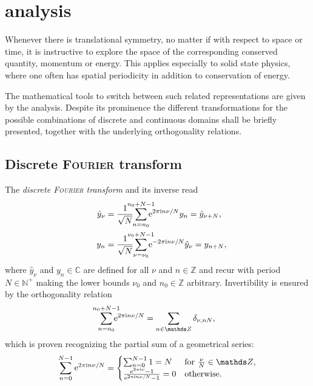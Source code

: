 
\chapter{ analysis}

Whenever there is translational symmetry, no matter if with respect to space or
time, it is instructive to explore the space of the corresponding conserved
quantity, momentum or energy. This applies especially to solid state physics,
where one often has spatial periodicity in addition to conservation of energy.

The mathematical tools to switch between such related representations are given
by the  analysis. Despite its prominence the different
transformations for the possible combinations of discrete and continuous domains
shall be briefly presented, together with the underlying orthogonality
relations.

\section{Discrete \textsc{Fourier} transform}

The \emph{discrete \textsc{Fourier} transform} and its inverse read
%
\begin{align*}
    \hat y_\nu &= \frac 1 {\sqrt N}
    \smashoperator{\sum_{n = n_0}^{n_0 + N - 1}}
    \E^{2 \pi \I n \nu / N} y_n = \hat y_{\nu + N},
    \\
    \quad y_n &= \frac 1 {\sqrt N}
    \smashoperator{\sum_{\nu = \nu_0}^{\nu_0 + N - 1}}
    \E^{-2 \pi \I n \nu / N} \hat y_\nu = y_{n + N},
\end{align*}
%
where $\hat y_\nu$ and $y_n \in \mathds C$ are defined for all $\nu$ and $n \in
\mathds Z$ and recur with period $N \in \mathds N^+$ making the lower bounds
$\nu_0$ and $n_0 \in \mathds Z$ arbitrary. Invertibility is ensured by the
orthogonality relation
%
\begin{equation} \label{DFT orthogonality relation}
    \smashoperator{\sum_{n = n_0}^{n_0 + N - 1}} \E^{2 \pi \I n \nu / N} =
    \sum_{n \in \mathds Z} \delta_{\nu, n N},
\end{equation}
%
which is proven recognizing the partial sum of a geometrical series:
%
\begin{equation*}
    \sum_{n = 0}^{N - 1} \E^{2 \pi \I n \nu / N} =
    \begin{cases}
        \sum_{n = 0}^{N - 1} 1 = N
            & \text{for $\frac \nu N \in \mathds Z$,} \\
        \frac{\E^{2 \pi \I \nu} - 1}{\E^{2 \pi \I n \nu / N} - 1} = 0
            & \text{otherwise.}
    \end{cases}
\end{equation*}

